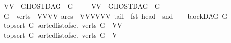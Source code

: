 \begin{isabellebody}
\ {\isachardoublequoteopen}{\isacharparenleft}{\kern0pt}V{}{\isacharcomma}{\kern0pt}V{}{\isacharparenright}{\kern0pt}\ {\isasymin}\ GHOSTDAG\ {}\ {\isacharquery}{\kern0pt}G{\isachardoublequoteclose}\ \isanewline
\ \ \isamarkupfalse%
\ {\isachardoublequoteopen}{\isacharparenleft}{\kern0pt}V{}{\isacharcomma}{\kern0pt}V{}{\isacharparenright}{\kern0pt}\ {\isasymnotin}\ GHOSTDAG\ {}\ {\isacharquery}{\kern0pt}G{}{\isachardoublequoteclose}\isanewline
\isanewline
\isanewline
\ \ \isamarkupfalse%
\ {\isacharquery}{\kern0pt}G{}\ {\isacharequal}{\kern0pt}\ {\isachardoublequoteopen}{\isasymlparr}verts\ {\isacharequal}{\kern0pt}\ {\isacharbraceleft}{\kern0pt}V{}{\isacharcomma}{\kern0pt}V{}{\isacharcomma}{\kern0pt}V{}{\isacharcomma}{\kern0pt}V{}{\isacharbraceright}{\kern0pt}{\isacharcomma}{\kern0pt}\ arcs\ {\isacharequal}{\kern0pt}\ {\isacharbraceleft}{\kern0pt}{\isacharparenleft}{\kern0pt}V{}{\isacharcomma}{\kern0pt}V{}{\isacharparenright}{\kern0pt}{\isacharcomma}{\kern0pt}{\isacharparenleft}{\kern0pt}V{}{\isacharcomma}{\kern0pt}V{}{\isacharparenright}{\kern0pt}{\isacharcomma}{\kern0pt}{\isacharparenleft}{\kern0pt}V{}{\isacharcomma}{\kern0pt}V{}{\isacharparenright}{\kern0pt}{\isacharbraceright}{\kern0pt}{\isacharcomma}{\kern0pt}\ tail\ {\isacharequal}{\kern0pt}\ fst{\isacharcomma}{\kern0pt}\ head\ {\isacharequal}{\kern0pt}\ snd{\isasymrparr}{\isachardoublequoteclose}\isanewline
\ \ \isamarkupfalse%
\ {\isachardoublequoteopen}blockDAG\ {\isacharquery}{\kern0pt}G{}{\isachardoublequoteclose}\isanewline
\ \ \isamarkupfalse%
\ {\isachardoublequoteopen}top{\isacharunderscore}{\kern0pt}sort\ {\isacharquery}{\kern0pt}G{}\ {\isacharparenleft}{\kern0pt}sorted{\isacharunderscore}{\kern0pt}list{\isacharunderscore}{\kern0pt}of{\isacharunderscore}{\kern0pt}set\ {\isacharparenleft}{\kern0pt}verts\ {\isacharquery}{\kern0pt}G{}\ {\isacharminus}{\kern0pt}\ {\isacharbraceleft}{\kern0pt}V{}{\isacharcomma}{\kern0pt}V{}{\isacharbraceright}{\kern0pt}{\isacharparenright}{\kern0pt}{\isacharparenright}{\kern0pt}{\isachardoublequoteclose}\isanewline
\ \ \isamarkupfalse%
\ {\isachardoublequoteopen}top{\isacharunderscore}{\kern0pt}sort\ {\isacharquery}{\kern0pt}G{}\ {\isacharparenleft}{\kern0pt}sorted{\isacharunderscore}{\kern0pt}list{\isacharunderscore}{\kern0pt}of{\isacharunderscore}{\kern0pt}set\ {\isacharparenleft}{\kern0pt}verts\ {\isacharquery}{\kern0pt}G{}\ {\isacharminus}{\kern0pt}\ {\isacharbraceleft}{\kern0pt}V{}{\isacharbraceright}{\kern0pt}{\isacharparenright}{\kern0pt}{\isacharparenright}{\kern0pt}{\isachardoublequoteclose}\isanewline

\end{isabellebody}
